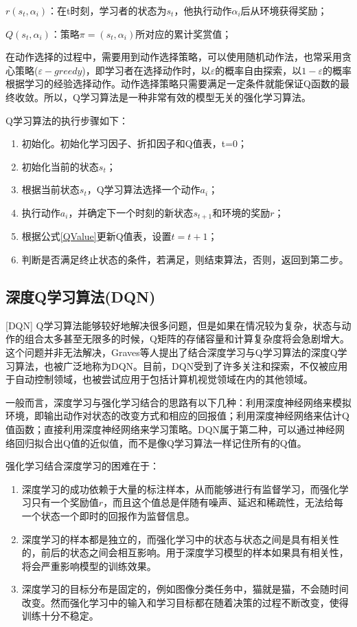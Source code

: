 $r(s_t,\alpha_i)$：在t时刻，学习者的状态为$s_t$，他执行动作$\alpha_i$后从环境获得奖励；

$Q(s_t,\alpha_i)$：策略$\pi=(s_t,\alpha_i)$所对应的累计奖赏值；

在动作选择的过程中，需要用到动作选择策略，可以使用随机动作法，也常采用贪心策略($\varepsilon-greedy$)，即学习者在选择动作时，以$\varepsilon$的概率自由探索，以$1-\varepsilon$的概率根据学习的经验选择动作。动作选择策略只需要满足一定条件就能保证Q函数的最终收敛。所以，Q学习算法是一种非常有效的模型无关的强化学习算法。

Q学习算法的执行步骤如下：
\begin{enumerate}
    \item 初始化。初始化学习因子、折扣因子和Q值表，t=0；
    \item 初始化当前的状态$s_t$；
    \item 根据当前状态$s_t$，Q学习算法选择一个动作$a_i$；
    \item 执行动作$a_i$，并确定下一个时刻的新状态$s_{t+1}$和环境的奖励$r$；
    \item 根据公式\ref{QValue}更新Q值表，设置$t = t+1$；
    \item 判断是否满足终止状态的条件，若满足，则结束算法，否则，返回到第二步。
\end{enumerate}

\subsection{深度Q学习算法(DQN)}[DQN]
Q学习算法能够较好地解决很多问题，但是如果在情况较为复杂，状态与动作的组合太多甚至无限多的时候，Q矩阵的存储容量和计算复杂度将会急剧增大。这个问题并非无法解决，Graves等人提出了结合深度学习与Q学习算法的深度Q学习算法\cite{DQNNature}，也被广泛地称为DQN。目前，DQN受到了许多关注和探索，不仅被应用于自动控制领域，也被尝试应用于包括计算机视觉领域在内的其他领域。

一般而言，深度学习与强化学习结合的思路有以下几种：利用深度神经网络来模拟环境，即输出动作对状态的改变方式和相应的回报值；利用深度神经网络来估计Q值函数；直接利用深度神经网络来学习策略。DQN属于第二种，可以通过神经网络回归拟合出Q值的近似值，而不是像Q学习算法一样记住所有的Q值。

强化学习结合深度学习的困难在于：
\begin{enumerate}    
    \item 深度学习的成功依赖于大量的标注样本，从而能够进行有监督学习，而强化学习只有一个奖励值$r$，而且这个值总是伴随有噪声、延迟和稀疏性，无法给每一个状态一个即时的回报作为监督信息。
    \item 深度学习的样本都是独立的，而强化学习中的状态与状态之间是具有相关性的，前后的状态之间会相互影响。用于深度学习模型的样本如果具有相关性，将会严重影响模型的训练效果。
    \item 深度学习的目标分布是固定的，例如图像分类任务中，猫就是猫，不会随时间改变。然而强化学习中的输入和学习目标都在随着决策的过程不断改变，使得训练十分不稳定。
\end{enumerate}

